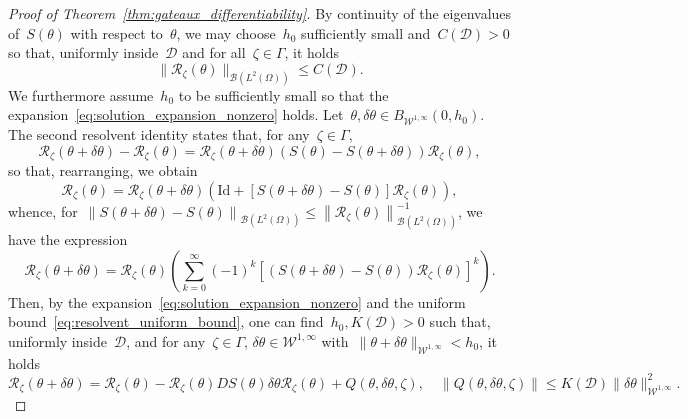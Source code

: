 \documentclass[a4]{article}
\newcommand{\1}{\mathbbm 1}
\newcommand{\Winf}{{{\cW}^{1,\infty}}}
\newcommand{\Id}{\mathrm{Id}}
\newcommand{\cW}{\mathcal{W}}
\begin{document}
\begin{proof}[Proof of Theorem~\ref{thm:gateaux_differentiability}]
    By continuity of the eigenvalues of~$S(\theta)$ with respect to~$\theta$, we may choose~$h_0$ sufficiently small and~$C(\mathcal D)>0$ so that, uniformly inside~$\mathcal D$ and for all~$\zeta\in \Gamma$, it holds
    \begin{equation}
        \label{eq:resolvent_uniform_bound}
        \|\mathcal R_\zeta(\theta)\|_{\mathcal B(L^2(\Omega))} \leq C(\mathcal D).
    \end{equation}
    We furthermore assume~$h_0$ to be sufficiently small so that the expansion~\eqref{eq:solution_expansion_nonzero} holds.
    Let~$\theta,\delta\theta \in B_{\Winf}(0,h_0)$.
    The second resolvent identity states that, for any~$\zeta\in \Gamma$,
    \begin{equation}
        \mathcal R_\zeta(\theta+\delta\theta) - \mathcal R_\zeta(\theta) = \mathcal R_\zeta(\theta+\delta\theta)(S(\theta)-S(\theta+\delta\theta))\mathcal R_\zeta(\theta),
    \end{equation}
    so that, rearranging, we obtain
    \begin{equation}
        \mathcal R_\zeta(\theta) = \mathcal R_\zeta(\theta+\delta\theta)\left(\Id +\left[S(\theta+\delta\theta) - S(\theta)\right]\mathcal R_\zeta(\theta)\right),
    \end{equation}
    whence, for~$\left\|S(\theta+\delta\theta)-S(\theta)\right\|_{\mathcal B(L^2(\Omega))}\leq \left\|\mathcal R_\zeta(\theta)\right\|_{\mathcal B(L^2(\Omega))}^{-1}$, we have the expression
    \begin{equation}
        \label{eq:neumann_series}
        \mathcal R_\zeta(\theta+\delta\theta) = \mathcal R_\zeta(\theta)\left(\sum_{k=0}^\infty (-1)^k\left[\left(S(\theta+\delta\theta) - S(\theta)\right)\mathcal R_\zeta(\theta)\right]^k \right).
    \end{equation}
    Then, by the expansion~\eqref{eq:solution_expansion_nonzero} and the uniform bound~\eqref{eq:resolvent_uniform_bound}, one can find~$h_0,K(\mathcal D)>0$ such that, uniformly inside~$\mathcal D$, and for any~$\zeta\in\Gamma,\,\delta\theta\in\Winf$ with~$\|\theta+\delta\theta\|_{\Winf}<h_0$, it holds
     \begin{equation}
        \label{eq:neumann_series_expansion}
        \mathcal R_\zeta(\theta+\delta\theta) = \mathcal R_\zeta(\theta) - \mathcal R_\zeta(\theta) D S(\theta)\delta\theta\mathcal R_\zeta(\theta) + Q(\theta,\delta\theta,\zeta),\quad\|Q(\theta,\delta\theta,\zeta)\|\leq K(\mathcal D)\|\delta\theta\|_{\Winf}^2.
    \end{equation}

\end{proof}
\end{document}
